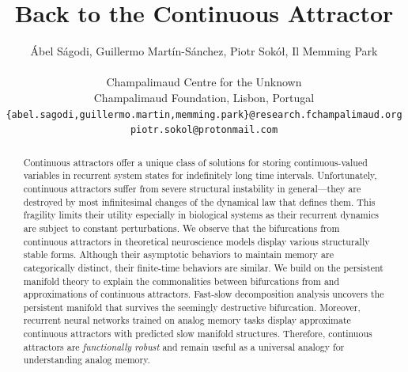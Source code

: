 \documentclass{article} %
\title{Back to the Continuous Attractor}
\author{
    \'Abel S\'agodi, Guillermo Martín-S\'anchez, Piotr Sok\'o\l, Il Memming Park \\
    \\
    Champalimaud Centre for the Unknown\\
    Champalimaud Foundation, Lisbon, Portugal\\
    \texttt{\{abel.sagodi,guillermo.martin,memming.park\}@research.fchampalimaud.org}\\
    \texttt{piotr.sokol@protonmail.com}
}
\newcounter{ct}
\theoremstyle{definition}
\theoremstyle{remark}
\begin{document}


\maketitle

\begin{abstract}
Continuous attractors offer a unique class of solutions for storing continuous-valued variables in recurrent system states for indefinitely long time intervals.
Unfortunately, continuous attractors suffer from severe structural instability in general---they are destroyed by most infinitesimal changes of the dynamical law that defines them.
This fragility limits their utility especially in biological systems as their recurrent dynamics are subject to constant perturbations.
We observe that the bifurcations from continuous attractors in theoretical neuroscience models display various structurally stable forms.
Although their asymptotic behaviors to maintain memory are categorically distinct, their finite-time behaviors are similar.
We build on the persistent manifold theory to explain the commonalities between bifurcations from and approximations of continuous attractors.
Fast-slow decomposition analysis uncovers the persistent manifold that survives the seemingly destructive bifurcation.
Moreover, recurrent neural networks trained on analog memory tasks display approximate continuous attractors with predicted slow manifold structures.
Therefore, continuous attractors are \emph{functionally robust} and remain useful as a universal analogy for understanding analog memory.
\end{abstract}
\end{document}
